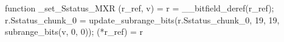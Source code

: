 function _set_Sstatus_MXR (r_ref, v) = {
    r = __bitfield_deref(r_ref);
    r.Sstatus_chunk_0 = update_subrange_bits(r.Sstatus_chunk_0, 19, 19, subrange_bits(v, 0, 0));
    (*r_ref) = r
}
